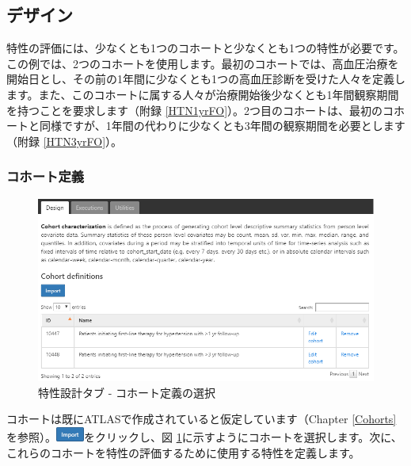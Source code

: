 \documentclass[
  11pt]{book}
\theoremstyle{definition}
\theoremstyle{definition}
\theoremstyle{definition}
\theoremstyle{definition}
\theoremstyle{remark}
\begin{document}
\subsection{デザイン}\label{ux30c7ux30b6ux30a4ux30f3}

特性の評価には、少なくとも1つのコホートと少なくとも1つの特性が必要です。この例では、2つのコホートを使用します。最初のコホートでは、高血圧治療を開始日とし、その前の1年間に少なくとも1つの高血圧診断を受けた人々を定義します。また、このコホートに属する人々が治療開始後少なくとも1年間観察期間を持つことを要求します（附録 \ref{HTN1yrFO}）。2つ目のコホートは、最初のコホートと同様ですが、1年間の代わりに少なくとも3年間の観察期間を必要とします（附録 \ref{HTN3yrFO}）。

\subsubsection*{コホート定義}\label{ux30b3ux30dbux30fcux30c8ux5b9aux7fa9}

\begin{figure}

{\centering \includegraphics[width=1\linewidth]{images/Characterization/atlasCharacterizationCohortSelection} 

}

\caption{特性設計タブ - コホート定義の選択}\label{fig:atlasCharacterizationCohortSelection}
\end{figure}

コホートは既にATLASで作成されていると仮定しています（Chapter \ref{Cohorts}を参照）。\includegraphics{images/Characterization/atlasImportButton.png}をクリックし、図 \ref{fig:atlasCharacterizationCohortSelection}に示すようにコホートを選択します。次に、これらのコホートを特性の評価するために使用する特性を定義します。
\end{document}
